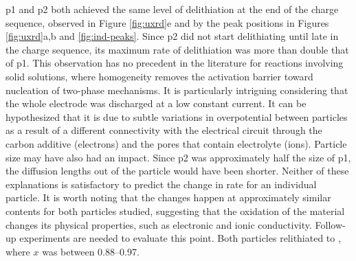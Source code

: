 \documentclass{article}
\begin{document}
\gls{p1} and \gls{p2} both achieved the same level of delithiation at
the end of the charge sequence, observed in Figure \ref{fig:uxrd}e and
by the peak positions in Figures \ref{fig:uxrd}a,b and
\ref{fig:ind-peaks}. Since \gls{p2} did not start delithiating until
late in the charge sequence, its maximum rate of delithiation was more
than double that of \gls{p1}. This observation has no precedent in the
literature for reactions involving solid solutions, where homogeneity
removes the activation barrier toward nucleation of two-phase
mechanisms. It is particularly intriguing considering that the whole
electrode was discharged at a low constant current. It can be
hypothesized that it is due to subtle variations in overpotential
between particles as a result of a different connectivity with the
electrical circuit through the carbon additive (electrons) and the
pores that contain electrolyte (ions). Particle size may have also had
an impact. Since \gls{p2} was approximately half the size of \gls{p1},
the  diffusion lengths out of the particle would have been
shorter. Neither of these explanations is satisfactory to predict the
change in rate for an individual particle. It is worth noting that the
changes happen at approximately similar  contents for both
particles studied, suggesting that the oxidation of the material
changes its physical properties, such as electronic and ionic
conductivity. Follow-up experiments are needed to evaluate this
point. Both particles relithiated to , where $x$ was between
\numrange{0.88}{0.97}.


\end{document}
